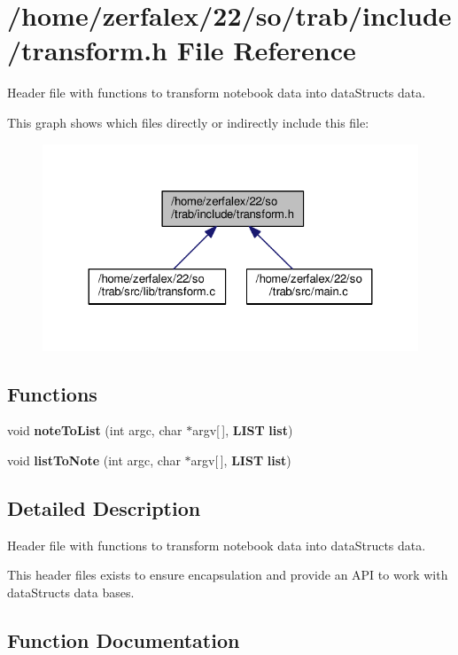 \section{/home/zerfalex/22/so/trab/include/transform.h File Reference}
\label{transform_8h}


Header file with functions to transform notebook data into data\+Structs data.  


This graph shows which files directly or indirectly include this file\+:\nopagebreak
\begin{figure}[H]
\begin{center}
\leavevmode
\includegraphics[width=324pt]{transform_8h__dep__incl}
\end{center}
\end{figure}
\subsection*{Functions}
\begin{DoxyCompactItemize}
\item 
void {\bf note\+To\+List} (int argc, char $\ast$argv[$\,$], {\bf L\+I\+ST} {\bf list})
\item 
void {\bf list\+To\+Note} (int argc, char $\ast$argv[$\,$], {\bf L\+I\+ST} {\bf list})
\end{DoxyCompactItemize}


\subsection{Detailed Description}
Header file with functions to transform notebook data into data\+Structs data. 

This header files exists to ensure encapsulation and provide an A\+PI to work with data\+Structs data bases. 

\subsection{Function Documentation}

